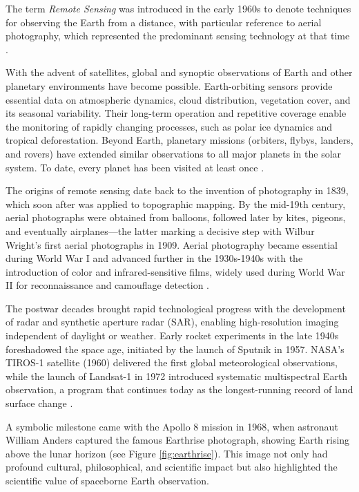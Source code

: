 The term \textit{Remote Sensing} was introduced in the early 1960s to denote techniques for observing the Earth from a distance, with particular reference to aerial photography, which represented the predominant sensing technology at that time \cite{book_Satellite_RS}.

With the advent of satellites, global and synoptic observations of Earth and other planetary environments have become possible. Earth-orbiting sensors provide essential data on atmospheric dynamics, cloud distribution, vegetation cover, and its seasonal variability. Their long-term operation and repetitive coverage enable the monitoring of rapidly changing processes, such as polar ice dynamics and tropical deforestation. Beyond Earth, planetary missions (orbiters, flybys, landers, and rovers) have extended similar observations to all major planets in the solar system. To date, every planet has been visited at least once \cite{book_Physics_Techniques_RS}.

The origins of remote sensing date back to the invention of photography in 1839, which soon after was applied to topographic mapping. By the mid-19th century, aerial photographs were obtained from balloons, followed later by kites, pigeons, and eventually airplanes—the latter marking a decisive step with Wilbur Wright's first aerial photographs in 1909. Aerial photography became essential during World War I and advanced further in the 1930s-1940s with the introduction of color and infrared-sensitive films, widely used during World War II for reconnaissance and camouflage detection \cite{book_Physics_Techniques_RS,book_Satellite_RS}.

The postwar decades brought rapid technological progress with the development of radar and synthetic aperture radar (SAR), enabling high-resolution imaging independent of daylight or weather. Early rocket experiments in the late 1940s foreshadowed the space age, initiated by the launch of Sputnik in 1957. NASA's TIROS-1 satellite (1960) delivered the first global meteorological observations, while the launch of Landsat-1 in 1972 introduced systematic multispectral Earth observation, a program that continues today as the longest-running record of land surface change \cite{book_Physics_Techniques_RS,book_Satellite_RS}.

A symbolic milestone came with the Apollo 8 mission in 1968, when astronaut William Anders captured the famous Earthrise photograph, showing Earth rising above the lunar horizon (see Figure \ref{fig:earthrise}). This image not only had profound cultural, philosophical, and scientific impact but also highlighted the scientific value of spaceborne Earth observation.

